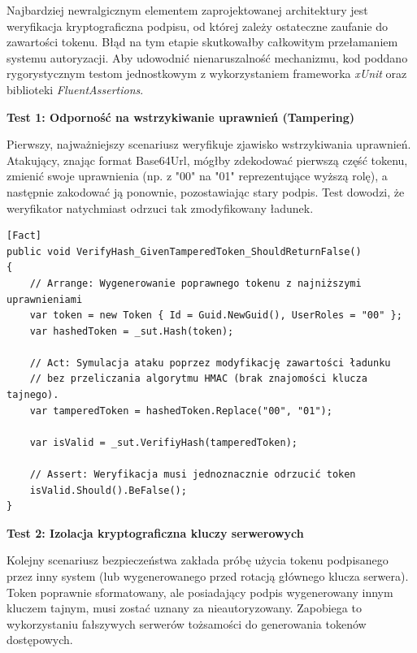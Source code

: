\documentclass{SGGW-thesis}
\begin{document}
Najbardziej newralgicznym elementem zaprojektowanej architektury jest weryfikacja kryptograficzna podpisu, od której zależy ostateczne zaufanie do zawartości tokenu. Błąd na tym etapie skutkowałby całkowitym przełamaniem systemu autoryzacji. Aby udowodnić nienaruszalność mechanizmu, kod poddano rygorystycznym testom jednostkowym z wykorzystaniem frameworka \textit{xUnit} oraz biblioteki \textit{FluentAssertions}.

\textbf{Test 1: Odporność na wstrzykiwanie uprawnień (Tampering)}

Pierwszy, najważniejszy scenariusz weryfikuje zjawisko wstrzykiwania uprawnień. Atakujący, znając format Base64Url, mógłby zdekodować pierwszą część tokenu, zmienić swoje uprawnienia (np. z "00" na "01" reprezentujące wyższą rolę), a następnie zakodować ją ponownie, pozostawiając stary podpis. Test dowodzi, że weryfikator natychmiast odrzuci tak zmodyfikowany ładunek.

\begin{verbatim}
[Fact]
public void VerifyHash_GivenTamperedToken_ShouldReturnFalse()
{
    // Arrange: Wygenerowanie poprawnego tokenu z najniższymi uprawnieniami
    var token = new Token { Id = Guid.NewGuid(), UserRoles = "00" };
    var hashedToken = _sut.Hash(token);
    
    // Act: Symulacja ataku poprzez modyfikację zawartości ładunku
    // bez przeliczania algorytmu HMAC (brak znajomości klucza tajnego).
    var tamperedToken = hashedToken.Replace("00", "01");

    var isValid = _sut.VerifiyHash(tamperedToken);

    // Assert: Weryfikacja musi jednoznacznie odrzucić token
    isValid.Should().BeFalse();
}
\end{verbatim}

\textbf{Test 2: Izolacja kryptograficzna kluczy serwerowych}

Kolejny scenariusz bezpieczeństwa zakłada próbę użycia tokenu podpisanego przez inny system (lub wygenerowanego przed rotacją głównego klucza serwera). Token poprawnie sformatowany, ale posiadający podpis wygenerowany innym kluczem tajnym, musi zostać uznany za nieautoryzowany. Zapobiega to wykorzystaniu fałszywych serwerów tożsamości do generowania tokenów dostępowych.
\end{document}
